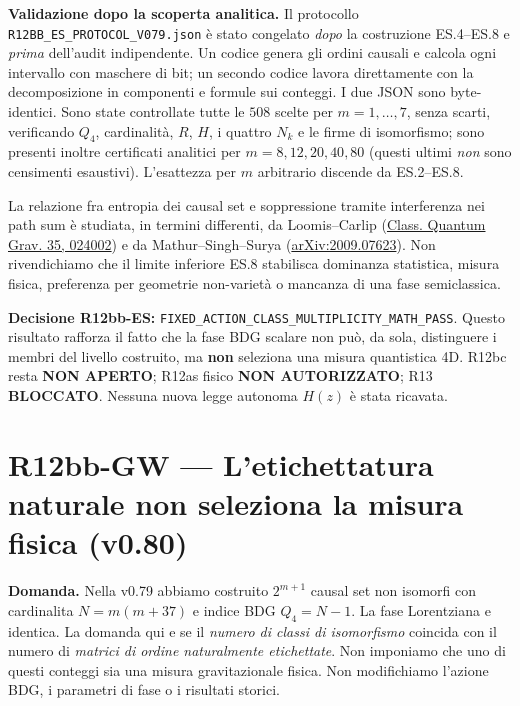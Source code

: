 \documentclass[11pt,a4paper]{article}
\begin{document}
\textbf{Validazione dopo la scoperta analitica.} Il protocollo \texttt{R12BB\_ES\_PROTOCOL\_V079.json} \`e stato congelato \emph{dopo} la costruzione ES.4--ES.8 e \emph{prima} dell'audit indipendente. Un codice genera gli ordini causali e calcola ogni intervallo con maschere di bit; un secondo codice lavora direttamente con la decomposizione in componenti e formule sui conteggi. I due JSON sono byte-identici. Sono state controllate tutte le $508$ scelte per $m=1,\ldots,7$, senza scarti, verificando $Q_4$, cardinalit\`a, $R$, $H$, i quattro $N_k$ e le firme di isomorfismo; sono presenti inoltre certificati analitici per $m=8,12,20,40,80$ (questi ultimi \emph{non} sono censimenti esaustivi). L'esattezza per $m$ arbitrario discende da ES.2--ES.8.

La relazione fra entropia dei causal set e soppressione tramite interferenza nei path sum \`e studiata, in termini differenti, da Loomis--Carlip (\href{https://doi.org/10.1088/1361-6382/aa980b}{Class. Quantum Grav. 35, 024002}) e da Mathur--Singh--Surya (\href{https://arxiv.org/abs/2009.07623}{arXiv:2009.07623}). Non rivendichiamo che il limite inferiore ES.8 stabilisca dominanza statistica, misura fisica, preferenza per geometrie non-variet\`a o mancanza di una fase semiclassica.

\textbf{Decisione R12bb-ES:} \texttt{FIXED\_ACTION\_CLASS\_MULTIPLICITY\_MATH\_PASS}. Questo risultato rafforza il fatto che la fase BDG scalare non pu\`o, da sola, distinguere i membri del livello costruito, ma \textbf{non} seleziona una misura quantistica 4D. R12bc resta \textbf{NON APERTO}; R12as fisico \textbf{NON AUTORIZZATO}; R13 \textbf{BLOCCATO}. Nessuna nuova legge autonoma $H(z)$ \`e stata ricavata.

\clearpage
\section*{R12bb-GW --- L'etichettatura naturale non seleziona la misura fisica (v0.80)}
\textbf{Domanda.} Nella v0.79 abbiamo costruito $2^{m+1}$ causal set non isomorfi con cardinalita $N=m(m+37)$ e indice BDG $Q_4=N-1$. La fase Lorentziana e identica. La domanda qui e se il \emph{numero di classi di isomorfismo} coincida con il numero di \emph{matrici di ordine naturalmente etichettate}. Non imponiamo che uno di questi conteggi sia una misura gravitazionale fisica. Non modifichiamo l'azione BDG, i parametri di fase o i risultati storici.
\end{document}
